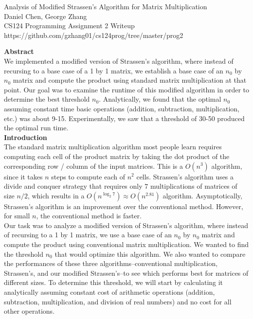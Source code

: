 \documentclass[12pt]{article}
\begin{document}
\begin{center}
Analysis of Modified Strassen's Algorithm for Matrix Multiplication \\
Daniel Chen, George Zhang \\
CS124 Programming Assignment 2 Writeup \\
https://github.com/gzhang01/cs124prog/tree/master/prog2 \\
\end{center}

\bigskip

\textbf{Abstract} \\
We implemented a modified version of Strassen's algorithm, where instead of recursing to a base case of a 1 by 1 matrix, we establish a base case of an $n_0$ by $n_0$ matrix and compute the product using standard matrix multiplication at that point. Our goal was to examine the runtime of this modified algorithm in order to determine the best threshold $n_0$. Analytically, we found that the optimal $n_0$ assuming constant time basic operations (addition, subtraction, multiplication, etc.) was about 9-15. Experimentally, we saw that a threshold of 30-50 produced the optimal run time. \\

\textbf{Introduction} \\
The standard matrix multiplication algorithm most people learn requires computing each cell of the product matrix by taking the dot product of the corresponding row / column of the input matrices. This is a $O(n^3)$ algorithm, since it takes $n$ steps to compute each of $n^2$ cells. Strassen's algorithm uses a divide and conquer strategy that requires only $7$ multiplications of matrices of size $n/2$, which results in a $O(n^{\log_2 7}) \approx O(n^{2.81})$ algorithm. Asymptotically, Strassen's algorithm is an improvement over the conventional method. However, for small $n$, the conventional method is faster. \\

Our task was to analyze a modified version of Strassen's algorithm, where instead of recursing to a 1 by 1 matrix, we use a base case of an $n_0$ by $n_0$ matrix and compute the product using conventional matrix multiplication. We wanted to find the threshold $n_0$ that would optimize this algorithm. We also wanted to compare the performances of these three algorithms--conventional multiplication, Strassen's, and our modified Strassen's--to see which performs best for matrices of different sizes. To determine this threshold, we will start by calculating it analytically assuming constant cost of arithmetic operations (addition, subtraction, multiplication, and division of real numbers) and no cost for all other operations. \\
\end{document}
